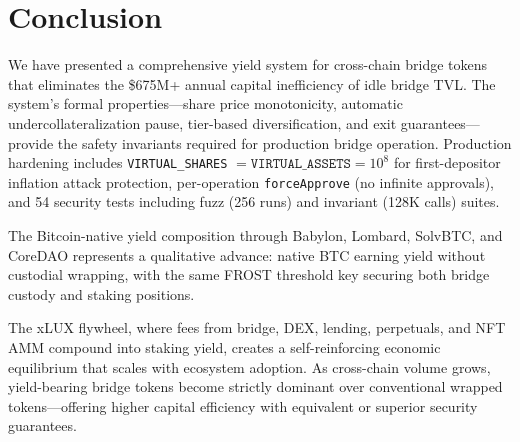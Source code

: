 \documentclass[11pt,twocolumn]{article}
\begin{document}
\section{Conclusion}\label{sec:conclusion}

We have presented a comprehensive yield system for cross-chain bridge tokens that eliminates the \$675M+ annual capital inefficiency of idle bridge TVL. The system's formal properties---share price monotonicity, automatic undercollateralization pause, tier-based diversification, and exit guarantees---provide the safety invariants required for production bridge operation. Production hardening includes \texttt{VIRTUAL\_SHARES} $= \texttt{VIRTUAL\_ASSETS} = 10^8$ for first-depositor inflation attack protection, per-operation \texttt{forceApprove} (no infinite approvals), and 54 security tests including fuzz (256 runs) and invariant (128K calls) suites.

The Bitcoin-native yield composition through Babylon, Lombard, SolvBTC, and CoreDAO represents a qualitative advance: native BTC earning yield without custodial wrapping, with the same FROST threshold key securing both bridge custody and staking positions.

The xLUX flywheel, where fees from bridge, DEX, lending, perpetuals, and NFT AMM compound into staking yield, creates a self-reinforcing economic equilibrium that scales with ecosystem adoption. As cross-chain volume grows, yield-bearing bridge tokens become strictly dominant over conventional wrapped tokens---offering higher capital efficiency with equivalent or superior security guarantees.
\end{document}
